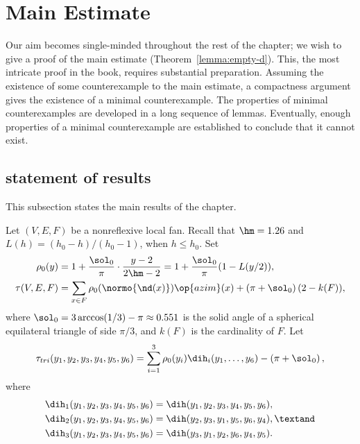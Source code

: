 \section{Main Estimate}\label{sec:weight}  

Our aim becomes single-minded throughout the rest of the chapter; we
wish to give a proof of the main estimate (Theorem~\ref{lemma:empty-d}).
This,  the most intricate proof in the book,  requires substantial
preparation.  Assuming the existence of some counterexample to the main estimate, a
compactness argument gives the existence of a minimal counterexample.
The properties of minimal counter\-examples are developed in a long
sequence of lemmas.  Eventually, enough properties of a minimal
counterexample are established to conclude that it cannot exist.

\subsection{statement of results}\label{sec:statement}

This subsection states the main results of the chapter.


\begin{definition}\label{def:tau}
Let $(V,E,F)$ be a nonreflexive local fan.  Recall that $\hm = 1.26$ and
$L(h) = ({h_0-h})/({h_0-1})$, when $h \le h_0$.
  Set
\begin{align*}
\rho_0(y) &= 1 + \dfrac{\sol_0}{\pi} \cdot
    \dfrac{y-2}{2\hm-2} = 1 + \dfrac{\sol_0}{\pi}(1 - L(y/2)),\\
  \tau(V,E,F) &=\sum_{x\in F} \rho_0(\normo{\nd(x)})\op{azim}(x)
+ \left(\pi+{\sol_0}\right) (2- k(F)),
\end{align*}
where $\sol_0=3\arccos(1/3)-\pi\approx0.551$ is the solid angle of a
spherical equilateral triangle of side $\pi/3$, and $k(F)$ is the
cardinality of $F$.  
Let 
\begin{equation}\label{eqn:tautri}
  \tau_{tri}(y_1,y_2,y_3,y_4,y_5,y_6) =
  \sum_{i=1}^3 \rho_0(y_i) \dih_i(y_1,\ldots,y_6)
- \left(\pi+{\sol_0}\right),
\end{equation}
where
\begin{align}\label{eqn:dihi}
\dih_1(y_1,y_2,y_3,y_4,y_5,y_6) &= \dih(y_1,y_2,y_3,y_4,y_5,y_6),\notag\\
\dih_2(y_1,y_2,y_3,y_4,y_5,y_6) &= \dih(y_2,y_3,y_1,y_5,y_6,y_4),\textand\notag \\
\dih_3(y_1,y_2,y_3,y_4,y_5,y_6) &= \dih(y_3,y_1,y_2,y_6,y_4,y_5).
\end{align}
%
%
%
%
%
%
%
\end{definition}


